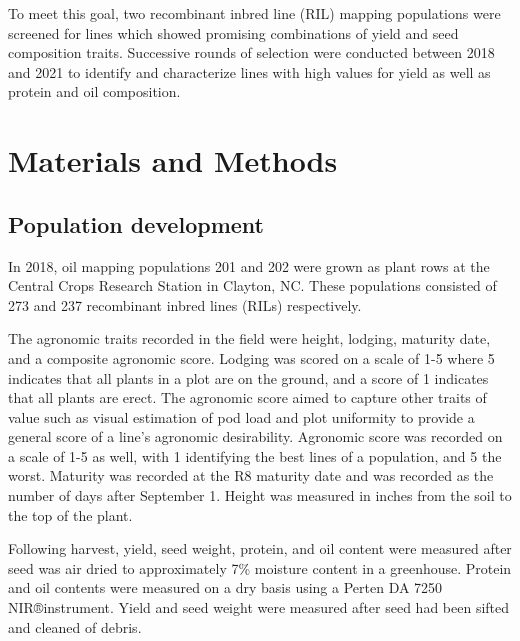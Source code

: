 \documentclass[Agronomy,article,submit,moreauthors,pdftex]{mdpi}
\begin{document}
To meet this goal, two recombinant inbred line (RIL) mapping populations
were screened for lines which showed promising combinations of yield and
seed composition traits. Successive rounds of selection were conducted
between 2018 and 2021 to identify and characterize lines with high
values for yield as well as protein and oil composition.

\hypertarget{materials-and-methods}{%
\section{Materials and Methods}\label{materials-and-methods}}

\hypertarget{population-development}{%
\subsection{Population development}\label{population-development}}

In 2018, oil mapping populations 201 and 202 were grown as plant rows at
the Central Crops Research Station in Clayton, NC. These populations
consisted of 273 and 237 recombinant inbred lines (RILs) respectively.

The agronomic traits recorded in the field were height, lodging,
maturity date, and a composite agronomic score. Lodging was scored on a
scale of 1-5 where 5 indicates that all plants in a plot are on the
ground, and a score of 1 indicates that all plants are
erect\citep{fehr1987soybeans}. The agronomic score aimed to capture
other traits of value such as visual estimation of pod load and plot
uniformity to provide a general score of a line's agronomic
desirability. Agronomic score was recorded on a scale of 1-5 as well,
with 1 identifying the best lines of a population, and 5 the worst.
Maturity was recorded at the R8 maturity date and was recorded as the
number of days after September 1. Height was measured in inches from the
soil to the top of the plant.

Following harvest, yield, seed weight, protein, and oil content were
measured after seed was air dried to approximately 7\% moisture content
in a greenhouse. Protein and oil contents were measured on a dry basis
using a Perten DA 7250 NIR®instrument. Yield and seed weight were
measured after seed had been sifted and cleaned of debris.
\end{document}
